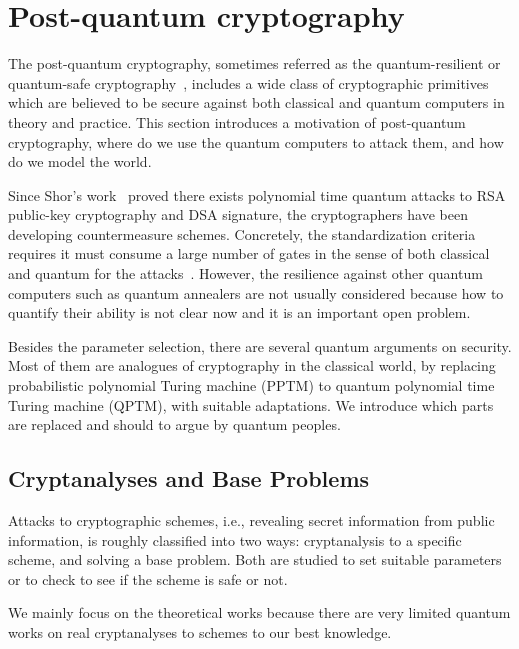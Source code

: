 


\newcommand{\memo}[1]{{\color{red} #1 }}

%
% 


\clearpage

\section{Post-quantum cryptography}

The post-quantum cryptography, sometimes referred as the quantum-resilient or quantum-safe cryptography~\cite{NISTpq}, includes a wide class of cryptographic primitives which are believed to be secure against both classical and quantum computers in theory and practice.
This section introduces a motivation of post-quantum cryptography, where do we use the quantum computers to attack them, and how do we model the world.

Since Shor's work~\cite{Shor97} proved there exists polynomial time 
quantum attacks to RSA public-key cryptography and DSA signature,
the cryptographers have been developing countermeasure schemes.
Concretely, the standardization criteria requires it must consume a large number 
of gates in the sense of both classical and quantum for the attacks~\cite[p.18]{NISTpq}.
However, the resilience against other quantum computers such as quantum annealers are not usually considered because how to quantify their ability is not clear now and it is an important open problem.

Besides the parameter selection, 
there are several quantum arguments on security.
Most of them are analogues of cryptography in the classical world, by replacing probabilistic polynomial Turing machine (PPTM) to quantum polynomial time Turing machine (QPTM), with suitable adaptations.
We introduce which parts are replaced and should to argue by quantum peoples.

\subsection{Cryptanalyses and Base Problems}

Attacks to cryptographic schemes, i.e., revealing secret information from public information, is roughly classified into two ways: cryptanalysis to a specific scheme, and solving a base problem.
Both are studied to set suitable parameters or to check to see if the scheme is safe or not.

We mainly focus on the theoretical works
because there are very limited quantum works on real cryptanalyses to schemes to our best knowledge.

